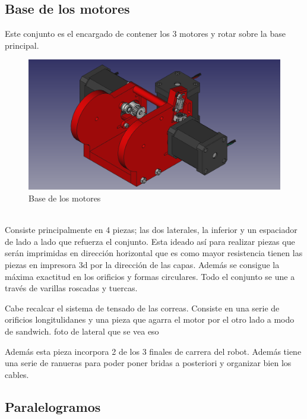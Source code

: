 \subsection{Base de los motores}
\noindent Este conjunto es el encargado de contener los 3 motores y rotar sobre la base principal.
\begin{figure} [ht!]
  \begin{center}
    \includegraphics[width=12cm]{figs/base_motores.png}
  \end{center}
  \caption{Base de los motores}
\end{figure}\ 
\\
Consiste principalmente en 4 piezas; las dos laterales, la inferior y un espaciador de lado a lado que refuerza el conjunto. Esta ideado así 
para realizar piezas que serán imprimidas en dirección horizontal que es como mayor resistencia tienen las piezas en impresora 3d por la 
dirección de las capas. Además se consigue la máxima exactitud en los orificios y formas circulares. Todo el conjunto se une a través de 
varillas roscadas y tuercas.

Cabe recalcar el sistema de tensado de las correas. Consiste en una serie de orificios longitulidanes y una pieza que agarra el motor por 
el otro lado a modo de sandwich.
foto de lateral que se vea eso

Además esta pieza incorpora 2 de los 3 finales de carrera del robot. Además tiene una serie de ranueras para poder poner bridas a posteriori y 
organizar bien los cables.
\newpage
\subsection{Paralelogramos}
\newpage
